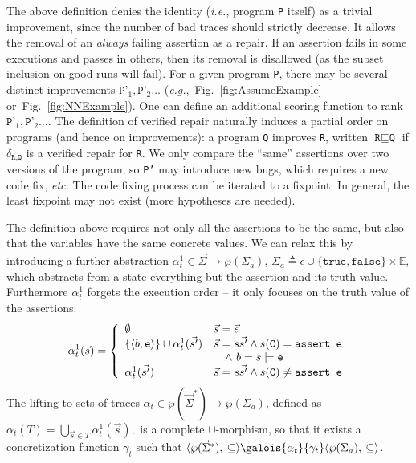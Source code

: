 \documentclass[10pt]{sigplanconf}
\newcommand{\refFig}[1]{Fig.~\ref{fig:#1}}
\newcommand{\code}[1]{\texttt{#1}}
\newcommand{\ltuple}[1]{\langle#1,\allowbreak}
\newcommand{\rtuple}[1]{\:#1\rangle}
\newcommand{\pair}[2]{\ltuple{#1}\rtuple{#2}}
\newcommand{\diff}[2]{\delta_{\code{#1}, \code{#2}}}
\newcommand{\emptytrace}{\vec{\epsilon}}
\begin{document}
The above definition denies the identity (\emph{i.e.}, program \code{P}
itself) as a trivial improvement, since the number of bad traces should
strictly decrease.  It allows the removal of an \emph{always} failing
assertion as a repair.  If an assertion fails in some executions and
passes in others, then its removal is disallowed (as the subset
inclusion on good runs will fail).  For a given program
\code{P}, there may be several distinct improvements $\code{P'}_1,
\code{P'}_2 \dots$ (\emph{e.g.},~\refFig{AssumeExample}
or~\refFig{NNExample}).  
One can define an additional scoring function to rank $\code{P'}_1, \code{P'}_2 \dots$.
The definition of verified repair naturally
induces a partial order on programs (and hence on improvements): a
program \code{Q} improves \code{R}, written $\code{R} \sqsubseteq
\code{Q}$ if $\diff{R}{Q}$ is a verified repair for \code{R}.  We
only compare the ``same'' assertions over two versions of the program,
so \code{P'} may introduce new bugs, which requires a new code fix,
\emph{etc.}  The code fixing process can be iterated to a fixpoint.
In general, the least fixpoint may not exist (more hypotheses are
needed).

The definition above requires not only all the assertions to be the
same, but also that the variables have the same concrete values. We
can relax this by introducing a further abstraction $\alpha^1_t \in
\vec{\Sigma} \rightarrow \wp(\Sigma_{a})$, $\Sigma_{a}
\triangleq \epsilon \cup \{ \code{true}, \code{false}\} \times
\mathbb{E}$, which abstracts from a state everything but the assertion
and its truth value.
Furthermore  $\alpha^1_t$ forgets the execution order -- it only focuses on the truth value of the assertions:
\[
\alpha^1_{t}(\vec{s}) = \left\{
\begin{array}{l l}
  \emptyset                                         &  \vec{s} = \emptytrace \\
  \{ \langle b, \code{e} \rangle \} \cup \alpha^1_{t}(\vec{s'}) &  \vec{s} = s\vec{s'} \wedge s(\code{C}) = \code{assert e} \\
                                                    &  \quad \wedge\ b = s \models \code{e}\\
  \alpha^1_{t}(\vec{s'})                             &  \vec{s} = s\vec{s'} \wedge s(\code{C}) \not= \code{assert e} 
\end{array}
\right.
\]
The lifting to sets of traces  $\alpha_{t} \in  \wp(\vec{\Sigma}^\ast) \rightarrow \wp(\Sigma_a)$, defined as 
\(
\alpha_{t}(T) = \bigcup_{\vec{s} \in T} \alpha^1_{t}(\vec{s}),
\)
is a complete $\cup$-morphism, so that it exists a concretization function $\gamma_{t}$ such that $\pair{\wp(\vec{\Sigma}^\ast)}{\subseteq}\galois{{\alpha_{t}}}{{\gamma_{t}}}\pair{\wp(\Sigma_a)}{\subseteq}$.
\end{document}
